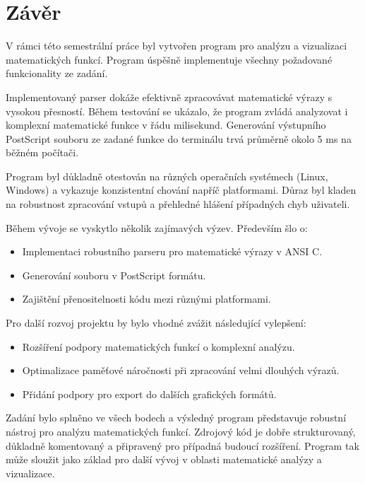 \documentclass[12pt]{article} %
\begin{document}
\section{Závěr}

V rámci této semestrální práce byl vytvořen program pro analýzu a vizualizaci matematických funkcí. Program úspěšně implementuje všechny požadované funkcionality ze zadání.

Implementovaný parser dokáže efektivně zpracovávat matematické výrazy s vysokou přesností. Během testování se ukázalo, že program zvládá analyzovat i komplexní matematické funkce v řádu milisekund. Generování výstupního PostScript souboru ze zadané funkce do terminálu trvá průměrně okolo 5 ms na běžném počítači.

Program byl důkladně otestován na různých operačních systémech (Linux, Windows) a vykazuje konzistentní chování napříč platformami. Důraz byl kladen na robustnost zpracování vstupů a přehledné hlášení případných chyb uživateli.

Během vývoje se vyskytlo několik zajímavých výzev. Především šlo o:
\begin{itemize}
    \item Implementaci robustního parseru pro matematické výrazy v ANSI C.
    \item Generování souboru v PostScript formátu.
    \item Zajištění přenositelnosti kódu mezi různými platformami.
\end{itemize}

Pro další rozvoj projektu by bylo vhodné zvážit následující vylepšení:
\begin{itemize}
    \item Rozšíření podpory matematických funkcí o komplexní analýzu.
    \item Optimalizace paměťové náročnosti při zpracování velmi dlouhých výrazů.
    \item Přidání podpory pro export do dalších grafických formátů.
\end{itemize}

Zadání bylo splněno ve všech bodech a výsledný program představuje robustní nástroj pro analýzu matematických funkcí. Zdrojový kód je dobře strukturovaný, důkladně komentovaný a připravený pro případná budoucí rozšíření. Program tak může sloužit jako základ pro další vývoj v oblasti matematické analýzy a vizualizace.


\newpage
\listoffigures

\renewcommand{\lstlistlistingname}{Seznam ukázek kódů}
\lstlistoflistings
\end{document}
